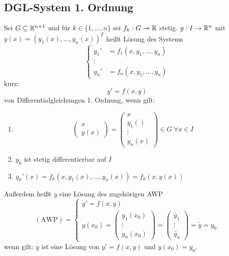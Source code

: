 \subsection{DGL-System 1. Ordnung}
Sei $G \subseteq \mathbb{R}^{n+1}$ und für $k\in\{1, \ldots, n\}$ sei $f_k: G \rightarrow \mathbb{R}$ stetig.
$y: I \rightarrow \mathbb{R}^n$ mit $y(x) = {(y_1(x), \ldots, y_n(x))}^T$ heißt Lösung des Systems
\begin{equation*}
	\begin{cases}
		y_1' &= f_1(x, y_1, \ldots, y_n) \\
		\vdots \\
		y_n' &= f_n(x, y_1, \ldots, y_n)
	\end{cases}
\end{equation*}
kurz:
\begin{equation*}
	y' = f(x,y)
\end{equation*}
von Differentialgleichungen 1. Ordnung, wenn gilt:
\begin{enumerate}
	\item 
		\begin{equation*}
			\begin{pmatrix}
				x \\ y(x)
			\end{pmatrix}
			=
			\begin{pmatrix}
				x \\ y_1() \\ \vdots \\ y_n(x)
			\end{pmatrix}
			\in G\ \forall x \in I
		\end{equation*}
	\item $y_k$ ist stetig differentierbar auf $I$
	\item $y_k'(x) = f_k(x, y_1(x), \ldots, y_n(x)) = f_k(x, y(x))$
\end{enumerate}
Außerdem heißt $y$ eine Lösung des zugehörigen AWP
\begin{equation*}
	(\text{AWP}) = 
	\begin{cases}
		y' = f(x,y) \\
		y(x_0) = 
		\begin{pmatrix}
			y_1(x_0) \\ \vdots \\ y_n(x_0)
		\end{pmatrix} = 
		\begin{pmatrix}
			\tilde{y_1} \\ \vdots \\ \tilde{y_n}
		\end{pmatrix} = 
		\tilde{y} = y_0
	\end{cases}
\end{equation*}
wenn gilt: $y$ ist eine Lösung von $y' = f(x,y)$ und $y(x_0) = y_0$.

